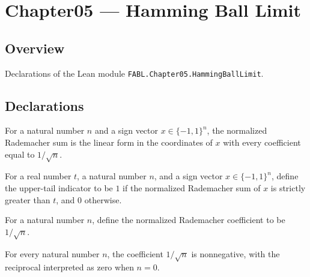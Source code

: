 \chapter{Chapter05 — Hamming Ball Limit}
\section{Overview}

Declarations of the Lean module \texttt{FABL.Chapter05.HammingBallLimit}.

\section{Declarations}

\begin{definition}
\label{FABL.normalizedRademacherSum}
\leanok
{}
For a natural number $n$ and a sign vector $x\in\{-1,1\}^n$, the normalized Rademacher
sum is the linear form in the coordinates of $x$ with every coefficient equal to
$1/\sqrt{n}$.
\end{definition}

\begin{definition}
\label{FABL.hammingUpperTailIndicator}
\leanok
{}
For a real number $t$, a natural number $n$, and a sign vector $x\in\{-1,1\}^n$, define
the upper-tail indicator to be $1$ if the normalized Rademacher sum of $x$ is strictly
greater than $t$, and $0$ otherwise.
\end{definition}

\begin{definition}
\label{FABL.normalizedRademacherCoefficient}
\leanok
For a natural number $n$, define the normalized Rademacher coefficient to be
$1/\sqrt{n}$.
\end{definition}

\begin{theorem}
\label{FABL.normalizedRademacherCoefficient_nonneg}
\leanok
{}
For every natural number $n$, the coefficient $1/\sqrt n$ is nonnegative, with the
reciprocal interpreted as zero when $n=0$.
\end{theorem}

